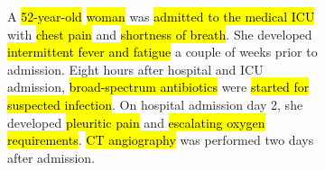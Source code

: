 \begin{figure}[t]
  \centering

  \begin{subfigure}[t]{0.49\textwidth}\vspace{0pt}
    \begin{tcolorbox}
    [
    colback=white,
    colframe=black!30,
    arc=2mm,
    boxrule=0.6pt,
    left=2mm,right=2mm,top=2mm,bottom=2mm
    ]
      \small\raggedright
      A \hl{52-year-old} \hl{woman} was \hl{admitted to the medical ICU} with \hl{chest pain} and \hl{shortness of breath}. She developed \hl{intermittent fever and fatigue} a couple of weeks prior to admission. Eight hours after hospital and ICU admission, \hl{broad-spectrum antibiotics} were \hl{started for suspected infection}. On hospital admission day 2, she developed \hl{pleuritic pain} and \hl{escalating oxygen requirements}. \hl{CT angiography} was performed two days after admission.
      

\end{tcolorbox}
\end{subfigure}
\end{figure}

